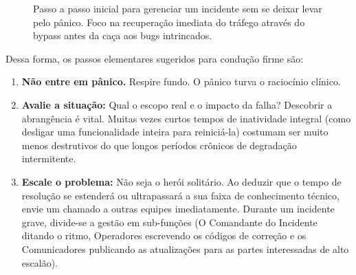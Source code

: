 \documentclass[12pt,a4paper,twoside]{report}
\begin{document}
\begin{figure}[h]
    \centering
    \caption{Passo a passo inicial para gerenciar um incidente sem se deixar levar pelo pânico. Foco na recuperação imediata do tráfego através do bypass antes da caça aos bugs intrincados.}
\end{figure}

Dessa forma, os passos elementares sugeridos para condução firme são:
\begin{enumerate}
    \item \textbf{Não entre em pânico.} Respire fundo. O pânico turva o raciocínio clínico.
    \item \textbf{Avalie a situação:} Qual o escopo real e o impacto da falha? Descobrir a abrangência é vital. Muitas vezes curtos tempos de inatividade integral (como desligar uma funcionalidade inteira para reiniciá-la) costumam ser muito menos destrutivos do que longos períodos crônicos de degradação intermitente.
    \item \textbf{Escale o problema:} Não seja o herói solitário. Ao deduzir que o tempo de resolução se estenderá ou ultrapassará a sua faixa de conhecimento técnico, envie um chamado a outras equipes imediatamente. Durante um incidente grave, divide-se a gestão em sub-funções (O Comandante do Incidente ditando o ritmo, Operadores escrevendo os códigos de correção e os Comunicadores publicando as atualizações para as partes interessadas de alto escalão).
\end{enumerate}
\end{document}
